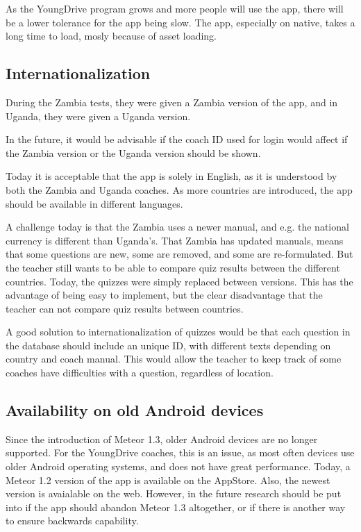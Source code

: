 As the YoungDrive program grows and more people will use the app, there will be a lower tolerance for the app being slow. The app, especially on native, takes a long time to load, mosly because of asset loading.

\subsection{Internationalization}
During the Zambia tests, they were given a Zambia version of the app, and in Uganda, they were given a Uganda version.

In the future, it would be advisable if the coach ID used for login would affect if the Zambia version or the Uganda version should be shown.

Today it is acceptable that the app is solely in English, as it is understood by both the Zambia and Uganda coaches. As more countries are introduced, the app should be available in different languages.

A challenge today is that the Zambia uses a newer manual, and e.g. the national currency is different than Uganda's. That Zambia has updated manuals, means that some questions are new, some are removed, and some are re-formulated. But the teacher still wants to be able to compare quiz results between the different countries. Today, the quizzes were simply replaced between versions. This has the advantage of being easy to implement, but the clear disadvantage that the teacher can not compare quiz results between countries.

A good solution to internationalization of quizzes would be that each question in the database should include an unique ID, with different texts depending on country and coach manual. This would allow the teacher to keep track of some coaches have difficulties with a question, regardless of location.

\subsection{Availability on old Android devices}
Since the introduction of Meteor 1.3, older Android devices are no longer supported. For the YoungDrive coaches, this is an issue, as most often devices use older Android operating systems, and does not have great performance. Today, a Meteor 1.2 version of the app is available on the AppStore. Also, the newest version is avaialable on the web. However, in the future research should be put into if the app should abandon Meteor 1.3 altogether, or if there is another way to ensure backwards capability.

